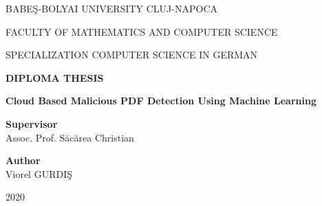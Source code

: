 \documentclass[a4paper,12pt,twoside]{report}
\begin{document}
\begin{titlepage}
	\sloppy
	\begin{center}
		BABE\c S-BOLYAI UNIVERSITY CLUJ-NAPOCA

		FACULTY OF MATHEMATICS AND COMPUTER SCIENCE

		SPECIALIZATION COMPUTER SCIENCE IN GERMAN

		\vspace{6cm}

		\Huge \textbf{DIPLOMA THESIS}

		\vspace{0.5cm}

		\Huge \textbf{Cloud Based Malicious PDF Detection Using Machine Learning}

	\end{center}

	\vspace{3cm}

	\begin{flushleft}
		\Large{\textbf{Supervisor}}\\
		Assoc. Prof. S\u{a}c\u{a}rea Christian
	\end{flushleft}

	\begin{flushright}
		\Large{\textbf{Author}}\\
		Viorel GURDI\c S
	\end{flushright}

	\vspace{3cm}

	\begin{center}
		2020
	\end{center}
\end{titlepage}
\end{document}
